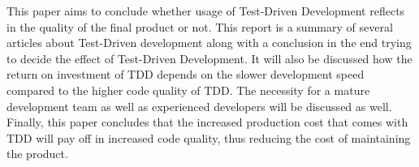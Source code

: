 This paper aims to conclude whether usage of Test-Driven Development reflects in the quality of the final product or not. This report is a summary of several articles about Test-Driven development along with a conclusion in the end trying to decide the effect of Test-Driven Development. It will also be discussed how the return on investment of TDD depends on the slower development speed compared to the higher code quality of TDD.  The necessity for a mature development team as well as experienced developers will be discussed as well. 
Finally, this paper concludes that the increased production cost that comes with TDD will pay off in increased code quality, thus reducing the cost of maintaining the product. 